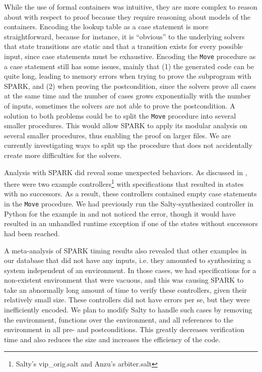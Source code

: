 \documentclass[runningheads]{llncs}
\begin{document}
While the use of formal containers was intuitive, they are more complex to reason about with respect to proof 
because they require reasoning about models of the containers. 
Encoding the lookup table as a case statement is more straightforward, because for instance, 
it is ``obvious'' to the underlying solvers that state transitions are static and that a transition exists for every possible input, since 
case statements must be exhaustive. 
Encoding the \lstinline{Move} procedure as a case statement still has some issues, mainly that 
(1) the generated code can be quite long, leading to memory errors when trying to prove the subprogram with SPARK, and
(2) when proving the postcondition, since the solvers prove all cases at the same time and the number of cases grows 
exponentially with the number of inputs, sometimes the solvers are not able to prove the postcondition.
A solution to both problems could be to split the \lstinline{Move} procedure into several smaller procedures. %
This would allow SPARK to apply its modular analysis on several smaller procedures, thus enabling the proof on larger files. 
We are currently investigating ways to split up the procedure that does not accidentally create more difficulties for the solvers.

Analysis with SPARK did reveal some unexpected behaviors. 
As discussed in , there were two example controllers\footnote{Salty's vip\_orig.salt and Anzu's arbiter.salt} 
with specifications that resulted in states with no successors. 
As a result, these controllers contained empty case statements in the \lstinline{Move} procedure. 
We had previously run the Salty-synthesized controller in Python for the example in  and not noticed the error, 
though it would have resulted in an unhandled runtime exception if one of the states without successors had been reached.  

A meta-analysis of SPARK timing results also revealed that other examples in our database that did not have any inputs, 
i.e. they amounted to synthesizing a system independent of an environment. 
In those cases, we had specifications for a non-existent environment that were vacuous, 
and this was causing SPARK to take an abnormally long amount of time to verify these controllers, given their relatively small size. 
These controllers did not have errors per se, 
but they were inefficiently encoded. 
We plan to modify Salty to handle such cases by removing the environment, functions over the environment, and
all references to the environment in all pre- and postconditions.
This greatly decreases verification time and also reduces the size and increases the efficiency of the code.
\end{document}

